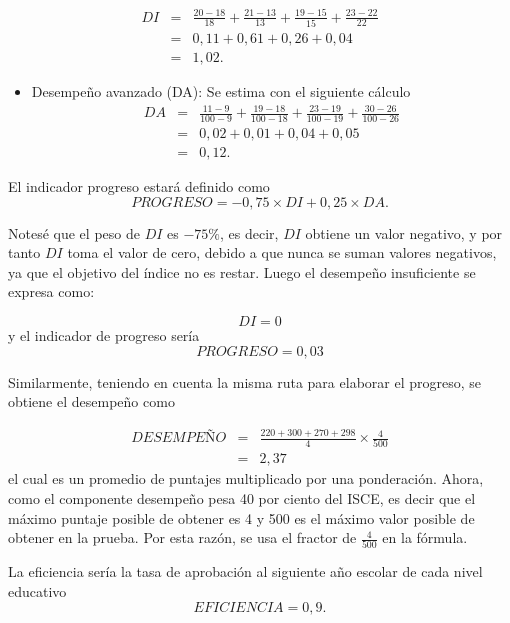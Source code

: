 \documentclass[
]{book}
\providecommand{\tightlist}{%
  \setlength{\itemsep}{0pt}\setlength{\parskip}{0pt}}
\begin{document}
\[\begin{eqnarray}
DI&=&\frac{20-18}{18}+\frac{21-13}{13}+\frac{19-15}{15}+\frac{23-22}{22}\\
&=&0,11+0,61+0,26+0,04\\
&=&1,02.
\end{eqnarray}\]

\begin{itemize}
\tightlist
\item
  Desempeño avanzado (DA): Se estima con el siguiente cálculo
  \[\begin{eqnarray}
  DA&=&\frac{11-9}{100-9}+\frac{19-18}{100-18}+\frac{23-19}{100-19}+\frac{30-26}{100-26}\\
  &=&0,02+0,01+0,04+0,05\\&=&0,12.
  \end{eqnarray}\]
\end{itemize}

El indicador progreso estará definido como
\[\begin{equation}
PROGRESO=  -0,75\times DI+0,25\times DA.
\end{equation}\]

Notesé que el peso de \(DI\) es \(-75\%\), es decir, \(DI\) obtiene un valor negativo, y por tanto \(DI\) toma el valor de cero, debido a que nunca se suman valores negativos, ya que el objetivo del índice no es restar. Luego el desempeño insuficiente se expresa como:

\[\begin{equation}
DI=0
\end{equation}\]
y el indicador de progreso sería
\[\begin{equation}
PROGRESO=  0,03
\end{equation}\]

Similarmente, teniendo en cuenta la misma ruta para elaborar el progreso, se obtiene el desempeño como

\[\begin{eqnarray}
DESEMPEÑO&=&  \frac{220+300+270+298}{4}\times \frac{4}{500}\\
&=& 2,37
\end{eqnarray}\]
el cual es un promedio de puntajes multiplicado por una ponderación. Ahora, como el componente desempeño pesa 40 por ciento del ISCE, es
decir que el máximo puntaje posible de obtener es 4 y 500 es el máximo valor posible de obtener en la prueba. Por esta razón, se usa el fractor de \(\frac{4}{500}\) en la fórmula.

La eficiencia sería la tasa de aprobación al siguiente año escolar de cada nivel educativo
\[\begin{equation}
EFICIENCIA= 0,9.
\end{equation}\]
\end{document}
